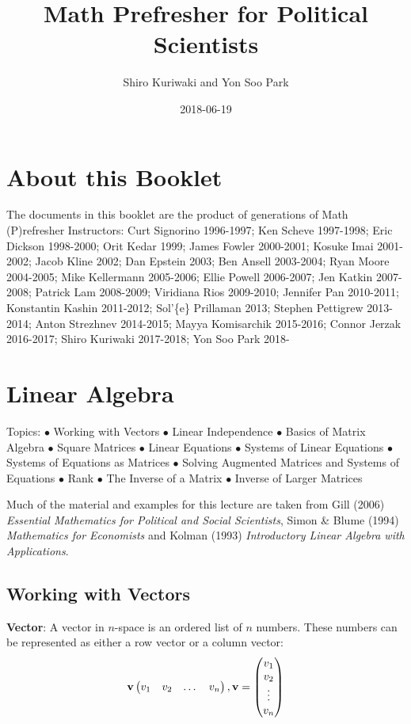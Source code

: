 \documentclass[]{book}
\title{Math Prefresher for Political Scientists}
\author{Shiro Kuriwaki and Yon Soo Park}
\date{2018-06-19}
\theoremstyle{definition}
\theoremstyle{definition}
\theoremstyle{definition}
\theoremstyle{remark}
\begin{document}
\maketitle

{
\setcounter{tocdepth}{1}
\tableofcontents
}
\chapter{About this Booklet}\label{about-this-booklet}

The documents in this booklet are the product of generations of Math
(P)refresher Instructors: Curt Signorino 1996-1997; Ken Scheve
1997-1998; Eric Dickson 1998-2000; Orit Kedar 1999; James Fowler
2000-2001; Kosuke Imai 2001-2002; Jacob Kline 2002; Dan Epstein 2003;
Ben Ansell 2003-2004; Ryan Moore 2004-2005; Mike Kellermann 2005-2006;
Ellie Powell 2006-2007; Jen Katkin 2007-2008; Patrick Lam 2008-2009;
Viridiana Rios 2009-2010; Jennifer Pan 2010-2011; Konstantin Kashin
2011-2012; Sol'\{e\} Prillaman 2013; Stephen Pettigrew 2013-2014; Anton
Strezhnev 2014-2015; Mayya Komisarchik 2015-2016; Connor Jerzak
2016-2017; Shiro Kuriwaki 2017-2018; Yon Soo Park 2018-

\chapter{Linear Algebra}\label{linear-algebra}

Topics: \(\bullet\) Working with Vectors \(\bullet\) Linear Independence
\(\bullet\) Basics of Matrix Algebra \(\bullet\) Square Matrices
\(\bullet\) Linear Equations \(\bullet\) Systems of Linear Equations
\(\bullet\) Systems of Equations as Matrices \(\bullet\) Solving
Augmented Matrices and Systems of Equations \(\bullet\) Rank \(\bullet\)
The Inverse of a Matrix \(\bullet\) Inverse of Larger Matrices

Much of the material and examples for this lecture are taken from Gill
(2006) \emph{Essential Mathematics for Political and Social Scientists},
Simon \& Blume (1994) \emph{Mathematics for Economists} and Kolman
(1993) \emph{Introductory Linear Algebra with Applications}.

\section{Working with Vectors}\label{working-with-vectors}

\textbf{Vector}: A vector in \(n\)-space is an ordered list of \(n\)
numbers. These numbers can be represented as either a row vector or a
column vector:
\[ {\bf v} \begin{pmatrix} v_1 & v_2 & \dots & v_n\end{pmatrix} , {\bf v} = \begin{pmatrix} v_1 \\ v_2 \\ \vdots \\ v_n \end{pmatrix}\]
\end{document}
